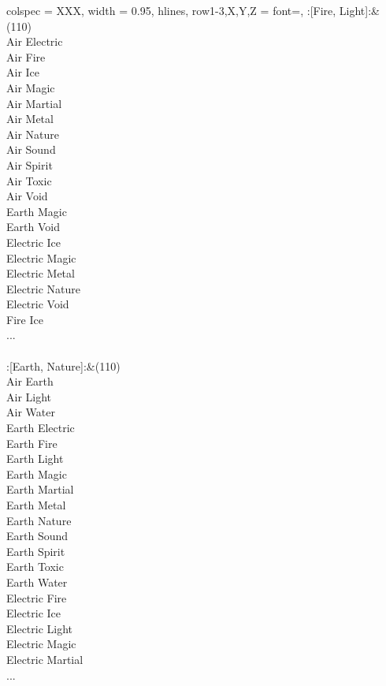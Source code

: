 \begin{longtblr}[
	caption = {2v2 Defending Weak},
	label = {2v2-Defending-Weak},
]{
	colspec = {XXX}, width = 0.95\linewidth,
	hlines,
	row{1-3,X,Y,Z} = {font=\bfseries},
}
	:[Fire, Light]:&{(110)\\
	Air Electric \\
	Air Fire \\
	Air Ice \\
	Air Magic \\
	Air Martial \\
	Air Metal \\
	Air Nature \\
	Air Sound \\
	Air Spirit \\
	Air Toxic \\
	Air Void \\
	Earth Magic \\
	Earth Void \\
	Electric Ice \\
	Electric Magic \\
	Electric Metal \\
	Electric Nature \\
	Electric Void \\
	Fire Ice \\
	...\\
	}\\

	:[Earth, Nature]:&{(110)\\
	Air Earth \\
	Air Light \\
	Air Water \\
	Earth Electric \\
	Earth Fire \\
	Earth Light \\
	Earth Magic \\
	Earth Martial \\
	Earth Metal \\
	Earth Nature \\
	Earth Sound \\
	Earth Spirit \\
	Earth Toxic \\
	Earth Water \\
	Electric Fire \\
	Electric Ice \\
	Electric Light \\
	Electric Magic \\
	Electric Martial \\
	...\\
	}\\


\end{longtblr}
